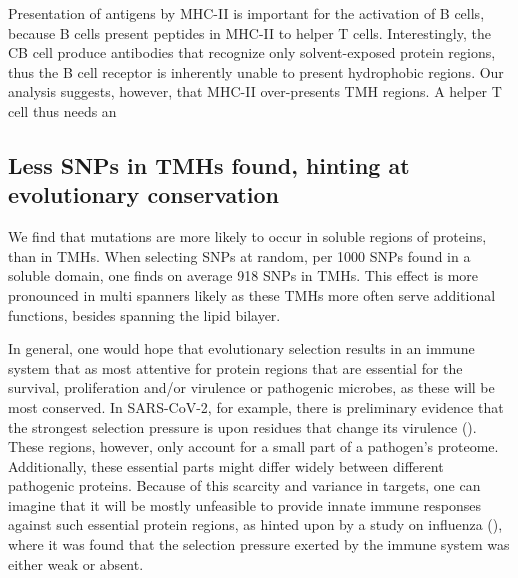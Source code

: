 Presentation of antigens by MHC-II is important for the activation of
B cells, because B cells present peptides in MHC-II to helper T cells.  
Interestingly, the CB cell produce antibodies that recognize only solvent-exposed protein regions,
thus the B cell receptor is inherently unable to present hydrophobic regions.
Our analysis suggests, however, that MHC-II
over-presents TMH regions. A helper T cell thus needs an 

\subsection{Less SNPs in TMHs found, hinting at evolutionary conservation}

We find that mutations are more likely to occur
in soluble regions of proteins, than in TMHs.
When selecting SNPs at random, per 1000 SNPs found in a soluble domain, 
one finds on average 918 SNPs in TMHs.
This effect is more pronounced in multi spanners likely as these TMHs more often serve additional functions, besides spanning the lipid bilayer. 

 
In general, one would hope that evolutionary selection results in
an immune system that as most attentive for protein regions that are
essential for the survival, proliferation and/or virulence or pathogenic microbes, as these will be most conserved.
In SARS-CoV-2, for example, there is preliminary evidence that the strongest
selection pressure is upon residues that change its 
virulence (\cite{velazquez2020positive}).
These regions, however, only account for a small part of a pathogen's proteome.
Additionally, these essential parts might differ widely between different pathogenic proteins.
Because of this scarcity and variance in targets, 
one can imagine that it will be mostly unfeasible to provide innate immune responses against such essential protein regions, 
as hinted upon by a study on influenza (\cite{han2019individual}),
where it was found that the selection pressure
exerted by the immune system was either weak or absent.
 

